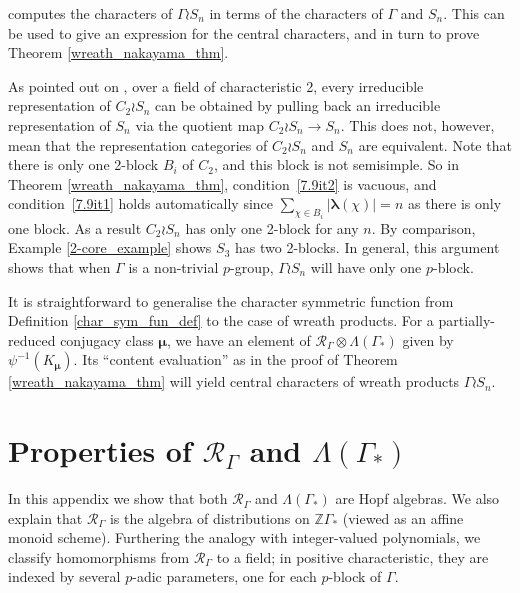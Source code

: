 \documentclass[ALCO,Unicode]{cedram}
\newcommand{\bs}{\boldsymbol}
\newcommand{\RGamma}{\mathcal{R}_{\Gamma}}
\newcommand{\LambdaG}{\Lambda(\Gamma_*)}
\newcommand{\RGamma}{\mathcal{R}_{\Gamma}}
\newcommand{\LambdaG}{\Lambda(\Gamma_*)}
\begin{document}
\begin{remark}
\cite[Appendix B, Chapter 1]{Macdonald} computes the characters of $\Gamma \wr S_n$ in terms of the characters of $\Gamma$ and $S_n$. This can be used to give an expression for the central characters, and in turn to prove Theorem \ref{wreath_nakayama_thm}.
\end{remark}

\begin{example}
As pointed out on \cite[Page 1]{DipperJames}, over a field of characteristic 2, every irreducible representation of $C_2 \wr S_n$ can be obtained by pulling back an irreducible representation of $S_n$ via the quotient map $C_2 \wr S_n \to S_n$. This does not, however, mean that the representation categories of $C_2 \wr S_n$ and $S_n$ are equivalent.  Note that there is only one 2-block $B_i$ of $C_2$, and this block is not semisimple. So in Theorem \ref{wreath_nakayama_thm}, condition~\ref{7.9it2} is vacuous, and condition~\ref{7.9it1} holds automatically since $\sum_{\chi \in B_i} |\bs\lambda(\chi)| = n$ as there is only one block. As a result $C_2 \wr S_n$ has only one 2-block for any $n$. By comparison, Example \ref{2-core_example} shows $S_3$ has two 2-blocks. In general, this argument shows that when $\Gamma$ is a non-trivial $p$-group, $\Gamma \wr S_n$ will have only one $p$-block.
\end{example}

\begin{remark}
It is straightforward to generalise the character symmetric function from Definition \ref{char_sym_fun_def} to the case of wreath products. For a partially-reduced conjugacy class $\bs\mu$, we have an element of $\RGamma \otimes \LambdaG$ given by $\psi^{-1}(K_{\bs\mu})$. Its ``content evaluation'' as in the proof of Theorem \ref{wreath_nakayama_thm} will yield central characters of wreath products $\Gamma \wr S_n$.
\end{remark}

\appendix
\section{Properties of \texorpdfstring{$\RGamma$}{R-Gamma} and \texorpdfstring{$\LambdaG$}{Lambda-Gamma}}
\label{appendix}

In this appendix we show that both $\RGamma$ and $\LambdaG$ are Hopf algebras. We also explain that $\RGamma$ is the algebra of distributions on $\mathbb{Z}\Gamma_*$ (viewed as an affine monoid scheme). Furthering the analogy with integer-valued polynomials, we classify homomorphisms from $\RGamma$ to a field; in positive characteristic, they are indexed by several $p$-adic parameters, one for each $p$-block of $\Gamma$.
\end{document}
